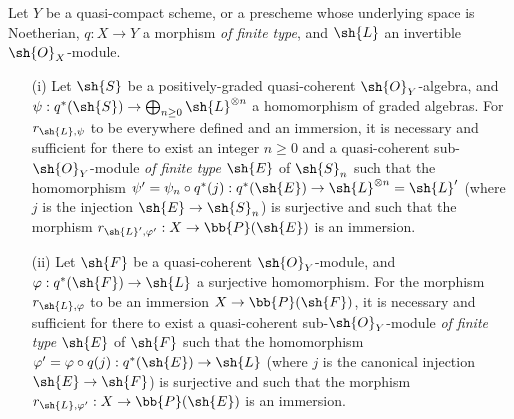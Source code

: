 \begin{proposition}[4.4.1]
\label{II.4.4.1}
Let $Y$ be a quasi-compact scheme, or a prescheme whose underlying space is Noetherian, $q:X\to Y$ a morphism \emph{of finite type}, and $\sh{L}$ an invertible $\sh{O}_X$-module.
\begin{enumerate}
  \item[\rm{(i)}] Let $\sh{S}$ be a positively-graded quasi-coherent $\sh{O}_Y$-algebra, and $\psi:q^*(\sh{S})\to\bigoplus_{n\geq0}\sh{L}^{\otimes n}$ a homomorphism of graded algebras.
    For $r_{\sh{L},\psi}$ to be everywhere defined and an immersion, it is necessary and
    sufficient for there to exist an integer $n\geq0$ and a quasi-coherent sub-$\sh{O}_Y$-module \emph{of finite type} $\sh{E}$ of $\sh{S}_n$ such that the homomorphism $\psi'=\psi_n\circ q^*(j):q^*(\sh{E})\to\sh{L}^{\otimes n}=\sh{L}'$ (where $j$ is the injection $\sh{E}\to\sh{S}_n$) is surjective and such that the morphism $r_{\sh{L}',\varphi'}:X\to\bb{P}(\sh{E})$ is an immersion.
  \item[\rm{(ii)}] Let $\sh{F}$ be a quasi-coherent $\sh{O}_Y$-module, and $\varphi:q^*(\sh{F})\to\sh{L}$ a surjective homomorphism.
    For the morphism $r_{\sh{L},\varphi}$ to be an immersion $X\to\bb{P}(\sh{F})$, it is necessary and sufficient for there to exist a quasi-coherent sub-$\sh{O}_Y$-module \emph{of finite type} $\sh{E}$ of $\sh{F}$ such that the homomorphism $\varphi'=\varphi\circ q(j):q^*(\sh{E})\to\sh{L}$ (where $j$ is the canonical injection $\sh{E}\to\sh{F}$) is surjective and such that the morphism $r_{\sh{L},\varphi'}:X\to\bb{P}(\sh{E})$ is an immersion.
\end{enumerate}
\end{proposition}

